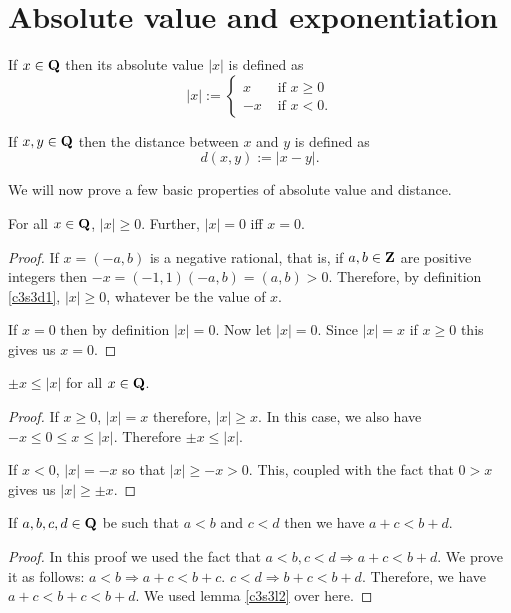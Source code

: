 \section{Absolute value and exponentiation}\label{c3s3}
\begin{defn}\label{c3s3d1}
If $x \in \mathbf{Q}$ then its absolute value $|x|$ is defined as
\[
|x| := \begin{cases}
x & \text{ if } x \ge 0 \\
-x & \text{ if } x < 0.
\end{cases}
\]
\end{defn}

\begin{defn}\label{c3s3d2}
If $x, y \in \mathbf{Q}$ then the distance between $x$ and $y$ is defined as 
\[
d(x, y) := |x - y|.
\]
\end{defn}

We will now prove a few basic properties of absolute value and distance.
\begin{lem}\label{c3s3l1}
For all $x \in \mathbf{Q}$, $|x| \ge 0$. Further, $|x| = 0$ iff $x = 0$.
\end{lem}
\begin{proof}
If $x = (-a, b)$ is a negative rational, that is, if $a, b \in \mathbf{Z}$ are 
positive integers then $-x = (-1, 1)(-a, b) = (a, b) > 0$. Therefore, by
definition \ref{c3s3d1}, $|x| \ge 0$, whatever be the value of $x$.

If $x = 0$ then by definition $|x| = 0$. Now let $|x| = 0$. Since $|x| = 
x$ if $x \ge 0$ this gives us $x = 0$.
\end{proof}

\begin{lem}\label{c3s3l2}
$\pm x \le |x|$ for all $x \in \mathbf{Q}$.
\end{lem}
\begin{proof}
If $x \ge 0$, $|x| = x$ therefore, $|x| \ge x$. In this case, we also have
$-x \le 0 \le x \le |x|$. Therefore $\pm x \le |x|$.

If $x < 0$, $|x| = -x$ so that $|x| \ge -x > 0$. This, coupled with the 
fact that $0 > x$ gives us $|x| \ge \pm x$.
\end{proof}

\begin{lem}\label{c3s3l3}
If $a, b, c, d \in \mathbf{Q}$ be such that $a < b$ and $c < d$ then we have
$a + c < b + d$.
\end{lem}
\begin{proof}
In this proof we used the fact that $a < b, c < d \Rightarrow a + c < b + 
d$. We prove it as follows: $a < b \Rightarrow a + c < b + c$. $c < d
\Rightarrow b + c < b + d$. Therefore, we have $a + c < b + c < b + d$.
We used lemma \ref{c3s3l2} over here.
\end{proof}

